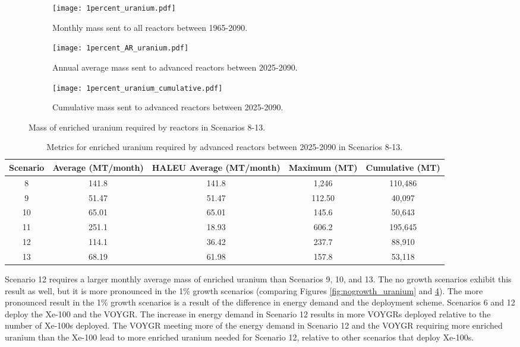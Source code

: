 \begin{figure}[h!]
    \centering
    \begin{subfigure}[b]{0.45\textwidth}
        \centering
        \texttt{[image: 1percent\_uranium.pdf]}
        \caption{Monthly mass sent to all reactors between 1965-2090.}
        \label{fig:1percent_all_uranium}
    \end{subfigure}
    \hfill
    \begin{subfigure}[b]{0.45\textwidth}
        \centering
        \texttt{[image: 1percent\_AR\_uranium.pdf]}
        \caption{Annual average mass sent to 
        advanced reactors between 2025-2090.}
        \label{fig:1percent_AR_uranium}
    \end{subfigure}
    \begin{subfigure}[b]{0.45\textwidth}
        \centering
        \texttt{[image: 1percent\_uranium\_cumulative.pdf]}
        \caption{Cumulative mass sent to advanced reactors 
        between 2025-2090.}
        \label{fig:1percent_uranium_cumulative}
    \end{subfigure}
       \caption{Mass of enriched uranium required by reactors
        in Scenarios 8-13.}
       \label{fig:1percent_uranium}
\end{figure}

\begin{table}[h!]
    \centering 
    \caption{Metrics for enriched uranium required by advanced reactors 
    between 2025-2090 in Scenarios 8-13.}
    \label{tab:1percent_uranium}
    \begin{tabular}{c c c c c}
        \hline
        Scenario & Average (MT/month) & \gls{HALEU} Average  
        (MT/month) & Maximum (MT) & Cumulative (MT)\\\hline
        8 & 141.8 & 141.8 & 1,246 & 110,486\\
        9 & 51.47 & 51.47 & 112.50 & 40,097\\
        10 & 65.01 & 65.01 & 145.6 & 50,643\\
        11 & 251.1 & 18.93 & 606.2 & 195,645\\
        12 & 114.1 & 36.42 & 237.7 & 88,910\\
        13 & 68.19 & 61.98 & 157.8 & 53,118\\
        \hline
    \end{tabular}
\end{table}

Scenario 12 requires a larger monthly average mass of enriched uranium 
than Scenarios 9, 10, and 13. The no growth scenarios exhibit this result
as well, but it is more pronounced in the 1\% growth scenarios (comparing 
Figures \ref{fig:nogrowth_uranium} and \ref{fig:1percent_uranium}). 
The more pronounced result in the 1\% growth scenarios is a result of the difference 
in energy demand and the deployment scheme. Scenarios 6 and 12 deploy the 
Xe-100 and the VOYGR. The increase in energy demand in Scenario 12 results 
in more VOYGRs deployed relative to the number of Xe-100s deployed. 
The VOYGR meeting more of the energy demand in Scenario 12 and the VOYGR 
requiring more enriched uranium than the Xe-100 lead to more 
enriched uranium needed for Scenario 12, relative to other scenarios 
that deploy Xe-100s.

